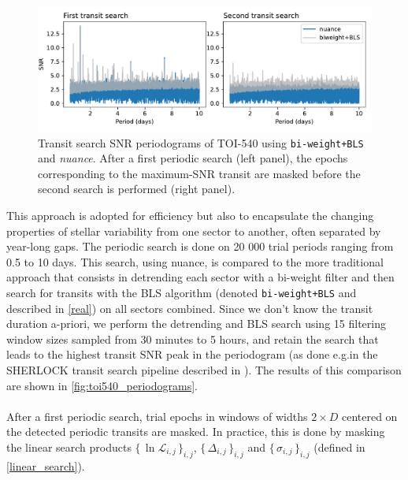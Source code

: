 \documentclass[modern]{aastex631}
\newcommand{\nuancemethod}{\textit{nuance}}
\newcommand{\nuance}{\nuancemethod{}}
\newcommand{\nuancecode}{\textsf{nuance}}
\newcommand{\set}[1]{\{\,#1\,\}}
\begin{document}
\begin{figure}[H]
    \begin{centering}
        \includegraphics[width=\linewidth]{../workflows/comparison_toi/figures/TOI 540/periodograms.pdf} 
        \caption{Transit search SNR periodograms of TOI-540 using \texttt{bi-weight+BLS} and \nuance{}. After a first periodic search (left panel), the epochs corresponding to the maximum-SNR transit are masked before the second search is performed (right panel).}
        \label{fig:toi540_periodograms}
    \end{centering}
\end{figure}
This approach is adopted for efficiency but also to encapsulate the changing properties of stellar variability from one sector to another, often separated by year-long gaps. The periodic search is done on 20 000 trial periods ranging from 0.5 to 10 days. This search, using \nuancecode{}, is compared to the more traditional approach that consists in detrending each sector with a bi-weight filter and then search for transits with the BLS algorithm (denoted \texttt{bi-weight+BLS} and described in \autoref{real}) on all sectors combined. Since we don't know the transit duration a-priori, we perform the detrending and BLS search using 15 filtering window sizes sampled from 30 minutes to 5 hours, and retain the search that leads to the highest transit SNR peak in the periodogram (as done e.g.\;in the SHERLOCK transit search pipeline described in \citealt{Pozuelos2020}). The results of this comparison are shown in \autoref{fig:toi540_periodograms}.\\\\
After a first periodic search, trial epochs in windows of widths $2\times D$ centered on the detected periodic transits are masked. In practice, this is done by masking the linear search products $\set{\ln\mathcal{L}_{i,j}}_{i, j}$, $\set{\Delta_{i,j}}_{i, j}$ and $\set{\sigma_{i,j}}_{i, j}$ (defined in \autoref{linear_search}).\\\\
\end{document}
